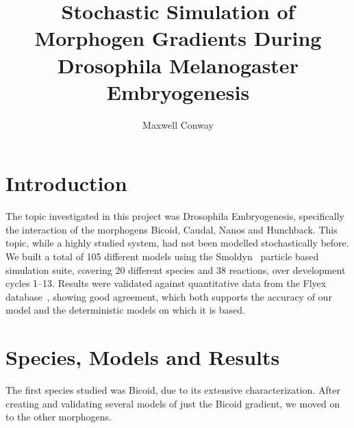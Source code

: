 \documentclass[11pt,a4paper,twocolumn]{article}
\begin{document}
\title{\vspace{-2em}Stochastic Simulation of Morphogen Gradients During Drosophila Melanogaster Embryogenesis\vspace{-10pt}}
\author{Maxwell Conway}
\date{\vspace{-30pt}}
\maketitle
\section{Introduction}
The topic investigated in this project was Drosophila Embryogenesis, specifically the interaction of the morphogens Bicoid, Caudal, Nanos and Hunchback. This topic, while a highly studied system, had not been modelled stochastically before. We built a total of 105 different models using the Smoldyn~\cite{Andrews2010} particle based simulation suite, covering 20 different species and 38 reactions, over development cycles 1--13. Results were validated against quantitative data from the Flyex database~\cite{Pisarev2009}, showing good agreement, which both supports the accuracy of our model and the deterministic models on which it is based. 

\section{Species, Models and Results}
The first species studied was Bicoid, due to its extensive characterization. After creating and validating several models of just the Bicoid gradient, we moved on to the other morphogens.
\end{document}
